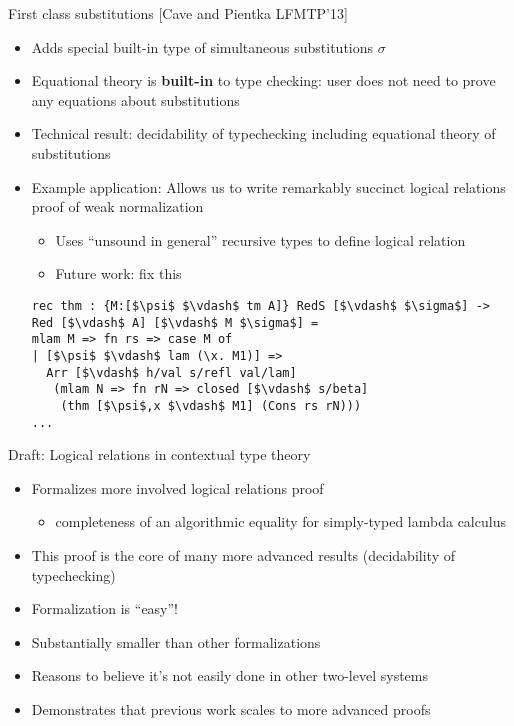 \documentclass[usenames,dvipsnames]{beamer}
\begin{document}
\begin{frame}[fragile]{First class substitutions [Cave and Pientka LFMTP'13]}
\begin{itemize}
\item Adds special built-in type of simultaneous substitutions $\sigma$
\item Equational theory is \textbf{built-in} to type checking: user does not need to prove any equations about substitutions
\item Technical result: decidability of typechecking including equational theory of substitutions
\item Example application: Allows us to write remarkably succinct logical relations proof of weak normalization
\begin{itemize}
\item Uses ``unsound in general'' recursive types to define logical relation
\item Future work: fix this
\end{itemize}
\begin{lstlisting}
rec thm : {M:[$\psi$ $\vdash$ tm A]} RedS [$\vdash$ $\sigma$] -> Red [$\vdash$ A] [$\vdash$ M $\sigma$] =
mlam M => fn rs => case M of
| [$\psi$ $\vdash$ lam (\x. M1)] =>
  Arr [$\vdash$ h/val s/refl val/lam]
   (mlam N => fn rN => closed [$\vdash$ s/beta]
    (thm [$\psi$,x $\vdash$ M1] (Cons rs rN)))
...
\end{lstlisting}
\end{itemize}
\end{frame}

\begin{frame}{Draft: Logical relations in contextual type theory}
\begin{itemize}
\item Formalizes more involved logical relations proof
\begin{itemize}
\item completeness of an algorithmic equality for simply-typed lambda calculus
\end{itemize}
\item This proof is the core of many more advanced results (decidability of typechecking)
\item Formalization is ``easy''!
\item Substantially smaller than other formalizations
\item Reasons to believe it's not easily done in other two-level systems
\item Demonstrates that previous work scales to more advanced proofs
\end{itemize}
\end{frame}
\end{document}
